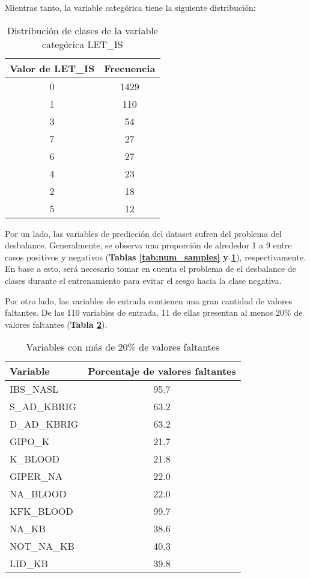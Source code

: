 \documentclass[conference]{IEEEtran}
\begin{document}
Mientras tanto, la variable categórica tiene la siguiente distribución:

\begin{table}[ht]
\centering
\caption{Distribución de clases de la variable categórica LET\_IS}
\begin{tabular}{c|c}

\textbf{Valor de LET\_IS} & \textbf{Frecuencia} \\
\hline
    \rule{0pt}{3ex}
    0 & 1429 \\
    1 & 110 \\
    3 & 54 \\
    7 & 27 \\
    6 & 27 \\
    4 & 23 \\
    2 & 18 \\
    5 & 12 \\

\end{tabular}
\label{tab:let_is_dist}
\end{table}

Por un lado, las variables de predicción del dataset sufren del problema del desbalance. Generalmente, se observa una proporción de alrededor 1 a 9 entre casos positivos y negativos (\textbf{Tablas \ref{tab:num_samples} y \ref{tab:let_is_dist}}), respectivamente. En base a esto, será necesario tomar en cuenta el problema de el desbalance de clases durante el entrenamiento para evitar el sesgo hacia la clase negativa. 

Por otro lado, las variables de entrada contienen una gran cantidad de valores faltantes. De las 110 variables de entrada, 11 de ellas presentan al menos 20\% de valores faltantes (\textbf{Tabla \ref{above_20_misssing_values_from_input}}).

\begin{table}[ht!]
\centering
\caption{Variables con más de 20\% de valores faltantes}
    \begin{tabular}{l|c}
    \textbf{Variable} & \textbf{Porcentaje de valores faltantes} \\
    \hline
    \rule{0pt}{3ex}
    IBS\_NASL     & 95.7 \\
    S\_AD\_KBRIG   & 63.2 \\
    D\_AD\_KBRIG   & 63.2 \\
    GIPO\_K       & 21.7 \\
    K\_BLOOD      & 21.8 \\
    GIPER\_NA     & 22.0 \\
    NA\_BLOOD     & 22.0 \\
    KFK\_BLOOD    & 99.7 \\
    NA\_KB        & 38.6 \\ 
    NOT\_NA\_KB    & 40.3 \\
    LID\_KB       & 39.8 \\
    \end{tabular}
\label{above_20_misssing_values_from_input}
\end{table}
\end{document}
